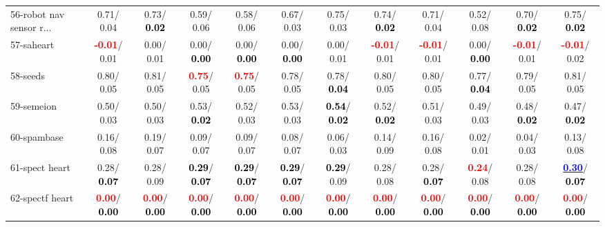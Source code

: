\begin{table}[h]
\begin{center}
{\begin{tabular}{lc|c|c|c|c|c|c|c|c|c|c}
56-robot nav sensor r... &   0.71/  0.04 &   0.73/\textcolor{black}{\textbf{  0.02}} &   0.59/  0.06 &   0.58/  0.06 &   0.67/  0.03 &   0.75/  0.03 &   0.74/\textcolor{black}{\textbf{  0.02}} &   0.71/  0.04 &   0.52/  0.08 &   0.70/\textcolor{black}{\textbf{  0.02}} &   0.75/\textcolor{black}{\textbf{  0.02}} \\
57-saheart & \textcolor{red}{\textbf{ -0.01}}/  0.01 &   0.00/  0.01 &   0.00/\textcolor{black}{\textbf{  0.00}} &   0.00/\textcolor{black}{\textbf{  0.00}} &   0.00/\textcolor{black}{\textbf{  0.00}} &   0.00/  0.01 & \textcolor{red}{\textbf{ -0.01}}/  0.01 & \textcolor{red}{\textbf{ -0.01}}/  0.01 &   0.00/\textcolor{black}{\textbf{  0.00}} & \textcolor{red}{\textbf{ -0.01}}/  0.01 & \textcolor{red}{\textbf{ -0.01}}/  0.02 \\
58-seeds &   0.80/  0.05 &   0.81/  0.05 & \textcolor{red}{\textbf{  0.75}}/  0.05 & \textcolor{red}{\textbf{  0.75}}/  0.05 &   0.78/  0.05 &   0.78/\textcolor{black}{\textbf{  0.04}} &   0.80/  0.05 &   0.80/  0.05 &   0.77/\textcolor{black}{\textbf{  0.04}} &   0.79/  0.05 &   0.81/  0.05 \\
59-semeion &   0.50/  0.03 &   0.50/  0.03 &   0.53/\textcolor{black}{\textbf{  0.02}} &   0.52/  0.03 &   0.53/  0.03 & \textcolor{black}{\textbf{  0.54}}/\textcolor{black}{\textbf{  0.02}} &   0.52/\textcolor{black}{\textbf{  0.02}} &   0.51/  0.03 &   0.49/  0.03 &   0.48/\textcolor{black}{\textbf{  0.02}} &   0.47/\textcolor{black}{\textbf{  0.02}} \\
60-spambase &   0.16/  0.08 &   0.19/  0.07 &   0.09/  0.07 &   0.09/  0.07 &   0.08/  0.07 &   0.06/  0.03 &   0.14/  0.09 &   0.16/  0.08 &   0.02/  0.01 &   0.04/  0.03 &   0.13/  0.08 \\ \hline
61-spect heart &   0.28/\textcolor{black}{\textbf{  0.07}} &   0.28/  0.09 & \textcolor{black}{\textbf{  0.29}}/\textcolor{black}{\textbf{  0.07}} & \textcolor{black}{\textbf{  0.29}}/\textcolor{black}{\textbf{  0.07}} & \textcolor{black}{\textbf{  0.29}}/\textcolor{black}{\textbf{  0.07}} & \textcolor{black}{\textbf{  0.29}}/  0.09 &   0.28/  0.08 &   0.28/\textcolor{black}{\textbf{  0.07}} & \textcolor{red}{\textbf{  0.24}}/  0.08 &   0.28/  0.08 & \underline{\textcolor{blue}{\textbf{  0.30}}}/\textcolor{black}{\textbf{  0.07}} \\
62-spectf heart & \textcolor{red}{\textbf{  0.00}}/\textcolor{black}{\textbf{  0.00}} & \textcolor{red}{\textbf{  0.00}}/\textcolor{black}{\textbf{  0.00}} & \textcolor{red}{\textbf{  0.00}}/\textcolor{black}{\textbf{  0.00}} & \textcolor{red}{\textbf{  0.00}}/\textcolor{black}{\textbf{  0.00}} & \textcolor{red}{\textbf{  0.00}}/\textcolor{black}{\textbf{  0.00}} & \textcolor{red}{\textbf{  0.00}}/\textcolor{black}{\textbf{  0.00}} & \textcolor{red}{\textbf{  0.00}}/\textcolor{black}{\textbf{  0.00}} & \textcolor{red}{\textbf{  0.00}}/\textcolor{black}{\textbf{  0.00}} & \textcolor{red}{\textbf{  0.00}}/\textcolor{black}{\textbf{  0.00}} & \textcolor{red}{\textbf{  0.00}}/\textcolor{black}{\textbf{  0.00}} & \textcolor{red}{\textbf{  0.00}}/\textcolor{black}{\textbf{  0.00}} \\

\end{tabular}}
\end{center}
\end{table}
